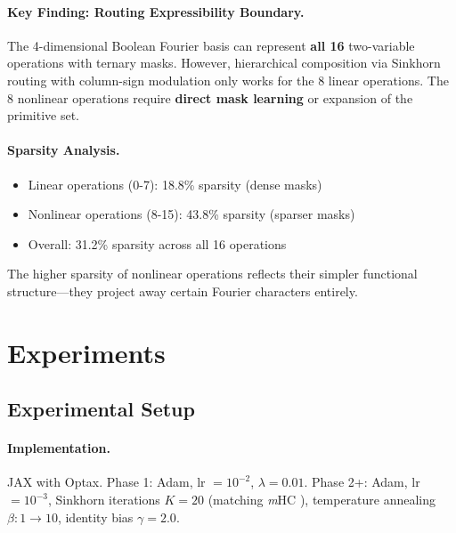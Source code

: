 \documentclass[Royal,times,sageh]{sagej}
\newcommand{\mHC}{\textit{m}HC}
\begin{document}
\paragraph{Key Finding: Routing Expressibility Boundary.}
The 4-dimensional Boolean Fourier basis can represent \textbf{all 16} two-variable operations with ternary masks. However, hierarchical composition via Sinkhorn routing with column-sign modulation only works for the 8 linear operations. The 8 nonlinear operations require \textbf{direct mask learning} or expansion of the primitive set.

\paragraph{Sparsity Analysis.}
\begin{itemize}
    \item Linear operations (0-7): 18.8\% sparsity (dense masks)
    \item Nonlinear operations (8-15): 43.8\% sparsity (sparser masks)
    \item Overall: 31.2\% sparsity across all 16 operations
\end{itemize}

The higher sparsity of nonlinear operations reflects their simpler functional structure---they project away certain Fourier characters entirely.

\section{Experiments}

\subsection{Experimental Setup}

\paragraph{Implementation.} JAX with Optax. Phase 1: Adam, lr $= 10^{-2}$, $\lambda = 0.01$. Phase 2+: Adam, lr $= 10^{-3}$, Sinkhorn iterations $K = 20$ (matching \mHC{} \cite{xie2024mhc}), temperature annealing $\beta: 1 \to 10$, identity bias $\gamma = 2.0$.
\end{document}

